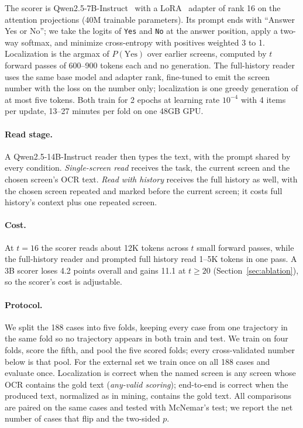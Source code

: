 The scorer is Qwen2.5-7B-Instruct~\citep{qwen25} with a LoRA~\citep{lora} adapter of rank 16 on the attention projections (40M trainable parameters). Its prompt ends with ``Answer Yes or No''; we take the logits of \texttt{Yes} and \texttt{No} at the answer position, apply a two-way softmax, and minimize cross-entropy with positives weighted 3 to 1. Localization is the argmax of $P(\text{Yes})$ over earlier screens, computed by $t$ forward passes of 600--900 tokens each and no generation. The full-history reader uses the same base model and adapter rank, fine-tuned to emit the screen number with the loss on the number only; localization is one greedy generation of at most five tokens. Both train for 2 epochs at learning rate $10^{-4}$ with 4 items per update, 13--27 minutes per fold on one 48GB GPU.

\paragraph{Read stage.} A Qwen2.5-14B-Instruct reader then types the text, with the prompt shared by every condition. \emph{Single-screen read} receives the task, the current screen and the chosen screen's OCR text. \emph{Read with history} receives the full history as well, with the chosen screen repeated and marked before the current screen; it costs full history's context plus one repeated screen.

\paragraph{Cost.} At $t=16$ the scorer reads about 12K tokens across $t$ small forward passes, while the full-history reader and prompted full history read 1--5K tokens in one pass. A 3B scorer loses 4.2 points overall and gains 11.1 at $t\ge20$ (Section~\ref{sec:ablation}), so the scorer's cost is adjustable.

\paragraph{Protocol.} We split the 188 cases into five folds, keeping every case from one trajectory in the same fold so no trajectory appears in both train and test. We train on four folds, score the fifth, and pool the five scored folds; every cross-validated number below is that pool. For the external set we train once on all 188 cases and evaluate once. Localization is correct when the named screen is any screen whose OCR contains the gold text (\emph{any-valid scoring}); end-to-end is correct when the produced text, normalized as in mining, contains the gold text. All comparisons are paired on the same cases and tested with McNemar's test; we report the net number of cases that flip and the two-sided $p$.

